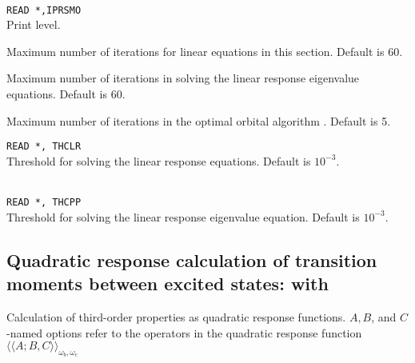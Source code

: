 \begin{description}
\item{}\\
\verb|READ *,IPRSMO|\\
Print level.

\item{}
Maximum number of iterations for linear equations in this section.
Default is 60.

\item{}
Maximum number of iterations in solving the linear
response eigenvalue 
equations.
Default is 60.

\item{}
Maximum number of iterations in the optimal
orbital algorithm 
\cite{tuhjahjajpjjcp84}. 
Default is 5.

\item{}
\verb|READ *, THCLR|\\
Threshold for solving the linear response equations.
Default is $10^{-3}$.

\item{}\\
\verb|READ *, THCPP|\\
Threshold for solving the linear response
eigenvalue equation. Default is $10^{-3}$.

\end{description}


\subsection{Quadratic response calculation of transition moments between excited states:
 with }

Calculation of third-order properties as quadratic response
functions.
$A,B$, and $C$-named options refer to the operators in the quadratic
response function 
$\langle\!\langle A;B,C \rangle\!\rangle_{\omega_b,\omega_c}$
\cite{ovhapjhjajthjojcp97,hhhjajpjjojcp97,haovhkpjthjcp98}

